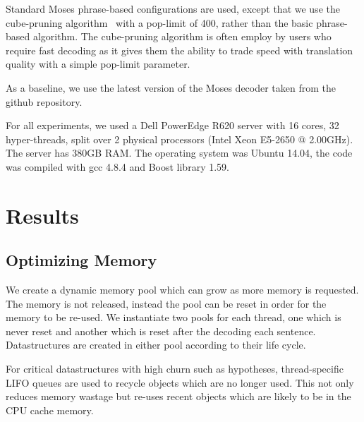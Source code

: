 \documentclass[11pt]{article}
\begin{document}
Standard Moses phrase-based configurations are used, except that we use the cube-pruning algorithm~\cite{Chiang:2007:cl} with a pop-limit of 400, rather than the basic phrase-based algorithm. The cube-pruning algorithm is often employ by users who require fast decoding as it gives them the ability to trade speed with translation quality with a simple pop-limit parameter.

As a baseline, we use the latest version of the Moses decoder taken from the github repository.

For all experiments, we used a Dell PowerEdge R620 server with 16 cores, 32 hyper-threads, split over 2 physical processors (Intel Xeon E5-2650 @ 2.00GHz). The server has 380GB RAM. The operating system was Ubuntu 14.04, the code was compiled with gcc 4.8.4 and Boost library 1.59.

\section{Results}

\subsection{Optimizing Memory}

We create a dynamic memory pool which can grow as more memory is requested. The memory is not released, instead the pool can be reset in order for the memory to be re-used. We instantiate two pools for each thread, one which is never reset and another which is reset after the decoding each sentence. Datastructures are created in either pool according to their life cycle.

For critical datastructures with high churn such as hypotheses, thread-specific LIFO queues are used to recycle objects which are no longer used. This not only reduces memory wastage but re-uses recent objects which are likely to be in the CPU cache memory.
\end{document}
